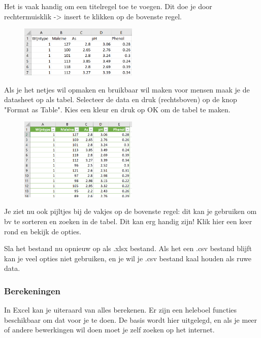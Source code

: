 Het is vaak handig om een titelregel toe te voegen. Dit doe je door rechtermuisklik -> insert te klikken op de bovenste regel.

\begin{figure}[h]
\begin{center}
\includegraphics[width=0.5\textwidth]{img/wijn2.png}
\end{center}
\end{figure}

Als je het netjes wil opmaken en bruikbaar wil maken voor mensen maak je de datasheet op als tabel. Selecteer de data en druk (rechtsboven) op de knop "Format as Table". Kies een kleur en druk op OK om de tabel te maken.
\begin{figure}[h]
\begin{center}
\includegraphics[width=0.5\textwidth]{img/wijn3.png}
\end{center}
\end{figure}

Je ziet nu ook pijltjes bij de vakjes op de bovenste regel: dit kan je gebruiken om bv te sorteren en zoeken in de tabel. Dit kan erg handig zijn! Klik hier een keer rond en bekijk de opties.

Sla het bestand nu opnieuw op als .xlsx bestand. Als het een .csv bestand blijft kan je veel opties niet gebruiken, en je wil je .csv bestand kaal houden als ruwe data. 

\subsubsection*{Berekeningen}
In Excel kan je uiteraard van alles berekenen. Er zijn een heleboel functies beschikbaar om dat voor je te doen. De basis wordt hier uitgelegd, en als je meer of andere bewerkingen wil doen moet je zelf zoeken op het internet.

